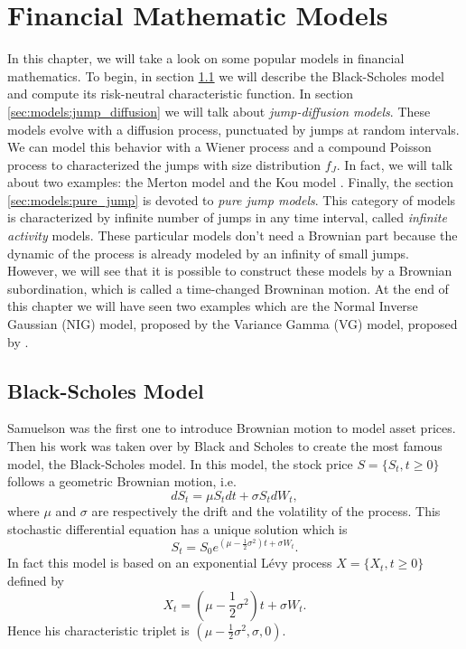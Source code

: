 \chapter{Financial Mathematic Models}
\label{sec:models}


In this chapter, we will take a look on some popular models in financial mathematics. To begin, in section \ref{sec:models:BS} we will describe the Black-Scholes model \citeyearpar{BS73} and compute its risk-neutral characteristic function. In section \ref{sec:models:jump_diffusion} we will talk about \textit{jump-diffusion models}. These models evolve with a diffusion process, punctuated by jumps at random intervals. We can model this behavior with a Wiener process and a compound Poisson process to characterized the jumps with size distribution $f_J$. In fact, we will talk about two examples: the Merton model \citeyearpar{Mer76} and the Kou model \citeyearpar{Kou02}. Finally, the section \ref{sec:models:pure_jump} is devoted to \textit{pure jump models}. This category of models is characterized by infinite number of jumps in any time interval, called \textit{infinite activity} models. These particular models don't need a Brownian part because the dynamic of the process is already modeled by an infinity of small jumps. However, we will see that it is possible to construct these models by a Brownian subordination, which is called a time-changed Browninan motion. At the end of this chapter we will have seen two examples which are the Normal Inverse Gaussian (NIG) model, proposed by \citeauthor{Bar97b} \citeyearpar{Bar97b} the Variance Gamma (VG) model, proposed by \citeauthor{MCC98} \citeyearpar{MCC98}.

\section{Black-Scholes Model}
\label{sec:models:BS}
Samuelson \citeyearpar{Sam65} was the first one to introduce Brownian motion to model asset prices. Then his work was taken over by Black and Scholes \citeyearpar{BS73} to create the most famous model, the Black-Scholes model. In this model, the stock price $S=\{S_t,t\geq0\}$ follows a geometric Brownian motion, i.e.
$$dS_t = \mu S_t dt + \sigma S_t dW_t,$$
where $\mu$ and $\sigma$ are respectively the drift and the volatility of the process. This stochastic differential equation has a unique solution which is
$$S_t = S_0e^{\left(\mu-\frac{1}{2}\sigma^2\right)t+\sigma W_t}.$$
In fact this model is based on an exponential L\'evy process $X=\{X_t,t\geq0\}$ defined by
$$X_t = \left(\mu - \frac{1}{2}\sigma^2\right)t + \sigma W_t.$$
Hence his characteristic triplet is $\left(\mu-\frac{1}{2}\sigma^2,\sigma,0\right)$.

